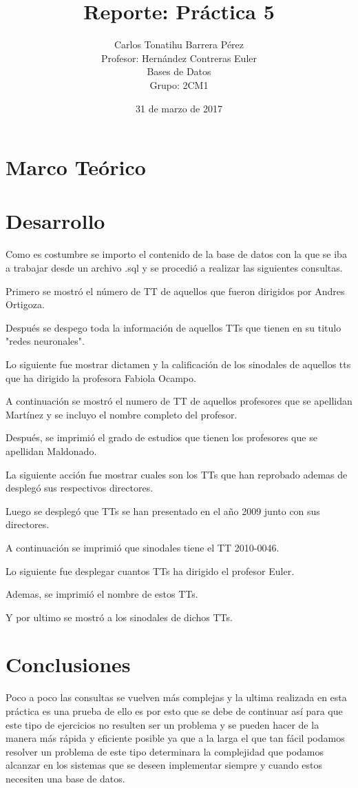 \documentclass[12pt, titlepage]{article}
\title{Reporte: Práctica 5}
\author{Carlos Tonatihu Barrera Pérez \\ Profesor: Hernández Contreras Euler \\ Bases de Datos \\ Grupo: 2CM1 }
\date{31 de marzo de 2017}
\begin{document}
	\maketitle
	\tableofcontents
	\section{Marco Teórico}
	\section{Desarrollo}
	Como es costumbre se importo el contenido de la base de datos con la que se iba a trabajar desde un archivo .sql y se procedió a realizar las siguientes consultas.
	
	Primero se mostró el número de TT de aquellos que fueron dirigidos por Andres Ortigoza.
	
	Después se despego toda la información de aquellos TTs que tienen en su titulo "redes neuronales".
	
	Lo siguiente fue mostrar dictamen y la calificación de los sinodales de aquellos tts que ha dirigido la profesora Fabiola Ocampo.
	
	A continuación se mostró el numero de TT de aquellos profesores que se apellidan Martínez y se incluyo el nombre completo del profesor.
	
	Después, se imprimió el grado de estudios que tienen los profesores que se apellidan Maldonado.
	
	La siguiente acción fue mostrar cuales son los TTs que han reprobado ademas de desplegó sus respectivos directores.
	
	Luego se desplegó que TTs se han presentado en el año 2009 junto con sus directores.
	
	A continuación se imprimió que sinodales tiene el TT 2010-0046.
	
	Lo siguiente fue desplegar cuantos TTs ha dirigido el profesor Euler.
	
	Ademas, se imprimió el nombre de estos TTs.
	
	Y por ultimo se mostró a los sinodales de dichos TTs.
	\section{Conclusiones}
	Poco a poco las consultas se vuelven más complejas y la ultima realizada en esta práctica es una prueba de ello es por esto que se debe de continuar así para que este tipo de ejercicios no resulten ser un problema y se pueden hacer de la manera más rápida y eficiente posible ya que a la larga el que tan fácil podamos resolver un problema de este tipo determinara la complejidad que podamos alcanzar en los sistemas que se deseen implementar siempre y cuando estos necesiten una base de datos.
	 
	
\end{document}
